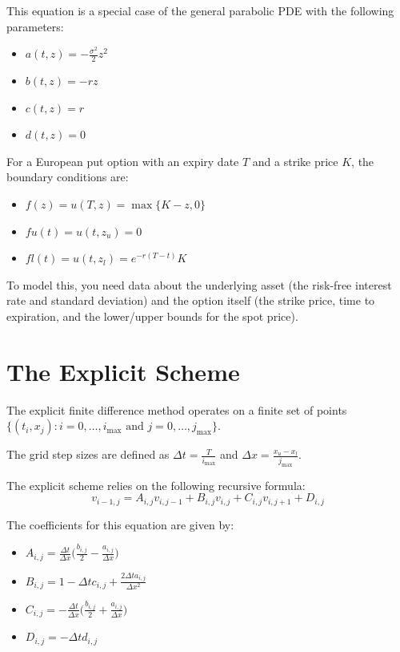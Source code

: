 \documentclass{article}
\begin{document}
This equation is a special case of the general parabolic PDE with the following parameters:
\begin{itemize}
    \item $a(t,z) = -\frac{\sigma^2}{2}z^2$
    \item $b(t,z) = -rz$
    \item $c(t,z) = r$
    \item $d(t,z) = 0$
\end{itemize}

For a European put option with an expiry date $T$ and a strike price $K$, the boundary conditions are:
\begin{itemize}
    \item $f(z) = u(T,z) = \max\{K-z,0\}$
    \item $fu(t) = u(t,z_u) = 0$
    \item $fl(t) = u(t,z_l) = e^{-r(T-t)}K$
\end{itemize}

To model this, you need data about the underlying asset (the risk-free interest rate and standard deviation) and the option itself (the strike price, time to expiration, and the lower/upper bounds for the spot price).

\section{The Explicit Scheme}



The explicit finite difference method operates on a finite set of points $\{(t_i, x_j):i=0,\dots,i_{\max}\text{ and } j=0,\dots,j_{\max}\}$.

The grid step sizes are defined as $\Delta t = \frac{T}{i_{\max}}$ and $\Delta x = \frac{x_u - x_l}{j_{\max}}$.

The explicit scheme relies on the following recursive formula:
\begin{equation}
v_{i-1,j}=A_{i,j}v_{i,j-1} + B_{i,j}v_{i,j} + C_{i,j}v_{i,j+1} + D_{i,j}
\end{equation}

The coefficients for this equation are given by:
\begin{itemize}
    \item $A_{i,j} = \frac{\Delta t}{\Delta x} \Big( \frac{b_{i,j}}{2}-\frac{a_{i,j}}{\Delta x}\Big)$
    \item $B_{i,j}=1-\Delta t c_{i,j} + \frac{2\Delta t a_{i,j}}{\Delta x^2}$
    \item $C_{i,j}=-\frac{\Delta t}{\Delta x}\Big( \frac{b_{i,j}}{2} + \frac{a_{i,j}}{\Delta x}\Big)$
    \item $D_{i,j}=-\Delta t d_{i,j}$
\end{itemize}
\end{document}
